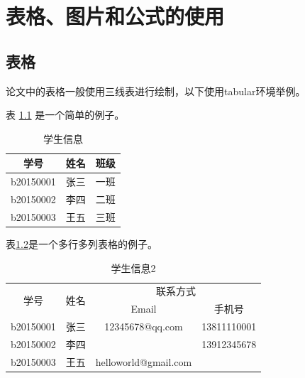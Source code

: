 
\chapter{表格、图片和公式的使用}
\section{表格}
论文中的表格一般使用三线表进行绘制，以下使用tabular环境举例。\par
表 \ref{student_info} 是一个简单的例子。 \par
\begin{table}
\begin{center}
\caption{学生信息}\label{student_info}
\begin{tabular}{ccc}
    \toprule
    学号  &   姓名  &   班级\\
    \midrule
    b20150001   &   张三  &   一班\\
    b20150002   &   李四  &   二班\\
    b20150003   &   王五  &   三班\\
    \bottomrule
\end{tabular}
\end{center}
\end{table}

表\ref{student_info2}是一个多行多列表格的例子。 \par
\begin{table}
\caption{学生信息2}
\label{student_info2}
\begin{center}
\begin{tabular}{cccc}
    \hline
    \multirow{2}{*}{学号}  &  \multirow{2}{*}{姓名}  &   \multicolumn{2}{c}{联系方式}\\
        &   &   Email   &   手机号\\
    \hline
    b20150001   &   张三  &   12345678@qq.com &   13811110001\\
    b20150002   &   李四  &       &   13912345678\\
    b20150003   &   王五  &   helloworld@gmail.com    &   \\
    \hline
\end{tabular}
\end{center}
\end{table}


